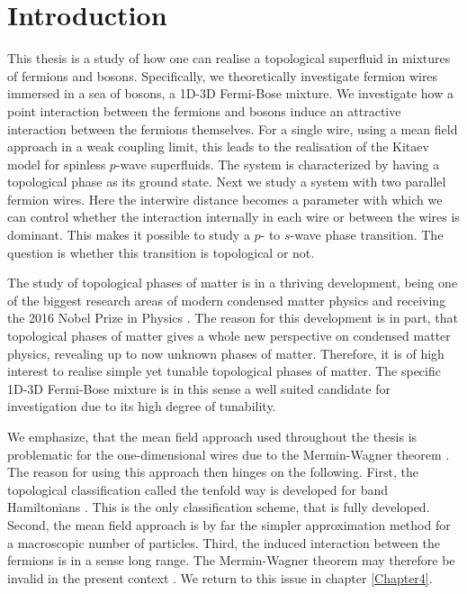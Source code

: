 
\chapter{Introduction} %

\label{Chapter1} %



This thesis is a study of how one can realise a topological superfluid in mixtures of fermions and bosons. Specifically, we theoretically investigate fermion wires immersed in a sea of bosons, a 1D-3D Fermi-Bose mixture. We investigate how a point interaction between the fermions and bosons induce an attractive interaction between the fermions themselves. For a single wire, using a mean field approach in a weak coupling limit, this leads to the realisation of the Kitaev model for spinless $p$-wave superfluids. The system is characterized by having a topological phase as its ground state. Next we study a system with two parallel fermion wires. Here the interwire distance becomes a parameter with which we can control whether the interaction internally in each wire or between the wires is dominant. This makes it possible to study a $p$- to $s$-wave phase transition. The question is whether this transition is topological or not. 

The study of topological phases of matter is in a thriving development, being one of the biggest research areas of modern condensed matter physics and receiving the 2016 Nobel Prize in Physics \cite{NobelPrize2016}. The reason for this development is in part, that topological phases of matter gives a whole new perspective on condensed matter physics, revealing up to now unknown phases of matter. Therefore, it is of high interest to realise simple yet tunable topological phases of matter. The specific 1D-3D Fermi-Bose mixture is in this sense a well suited candidate for investigation due to its high degree of tunability. 

We emphasize, that the mean field approach used throughout the thesis is problematic for the one-dimensional wires due to the Mermin-Wagner theorem \cite{Hohenberg.MerminWagnertheorem}. The reason for using this approach then hinges on the following. First, the topological classification called the tenfold way is developed for band Hamiltonians \cite{Ryu.Topology}. This is the only classification scheme, that is fully developed. Second, the mean field approach is by far the simpler approximation method for a macroscopic number of particles. Third, the induced interaction between the fermions is in a sense long range. The Mermin-Wagner theorem may therefore be invalid in the present context \cite{Ortiz.Beyondmeanfieldtheory}. We return to this issue in chapter \ref{Chapter4}. 

